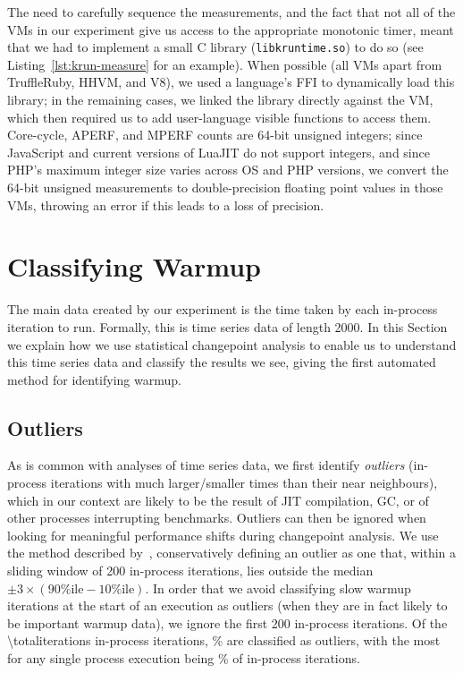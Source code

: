 \documentclass[acmsmall]{acmart}\settopmatter{printfolios=true}
\newcommand{\numiterations}{2000\xspace}
\begin{document}
The need to carefully sequence the measurements, and the fact that not all of
the VMs in our experiment give us access to the appropriate monotonic timer,
meant that we had to implement a small C library (\texttt{libkruntime.so}) to do so
(see Listing~\ref{lst:krun-measure} for an example). When possible
(all VMs apart from TruffleRuby, HHVM, and V8), we used a language's FFI to dynamically load this library;
in the remaining cases, we linked the library directly against the VM, which
then required us to add user-language visible functions to access them.
Core-cycle, APERF, and MPERF counts are 64-bit unsigned integers; since
JavaScript and current versions of LuaJIT do not support
integers, and since PHP's maximum integer size varies across OS and PHP versions, we
convert the 64-bit unsigned measurements to
double-precision floating point values in those VMs, throwing an error if this leads to a
loss of precision.


\section{Classifying Warmup}
\label{sec:stats}

The main data created by our experiment is the time taken by each in-process
iteration to run. Formally, this is time series data of length \numiterations. In
this Section we explain how we use statistical changepoint analysis to enable us to
understand this time series data and classify the results we see, giving the
first automated method for identifying warmup.


\subsection{Outliers}

As is common with analyses of time series data, we first identify
\emph{outliers} (in-process iterations with much larger/smaller times than their near
neighbours), which in our context are likely to be the result of JIT compilation,
GC, or of other processes interrupting benchmarks. Outliers can then be ignored
when looking for meaningful performance shifts during changepoint analysis. We use the method described
by~\citet{tukey1977exploratory}, conservatively defining an outlier as one that, within a
sliding window of 200 in-process iterations, lies outside the median $\pm
3\times(90\%\textrm{ile} - 10\%\textrm{ile})$. In order that we avoid classifying
slow warmup iterations at the start of an execution as outliers (when they are
in fact likely to be important warmup data), we ignore the first 200 in-process
iterations. Of the \num{\totaliterations}\xspace in-process
iterations, \totaloutlierspercentage\% are classified as outliers, with the most for
%
any single process execution being \result\% of in-process iterations.
\end{document}
